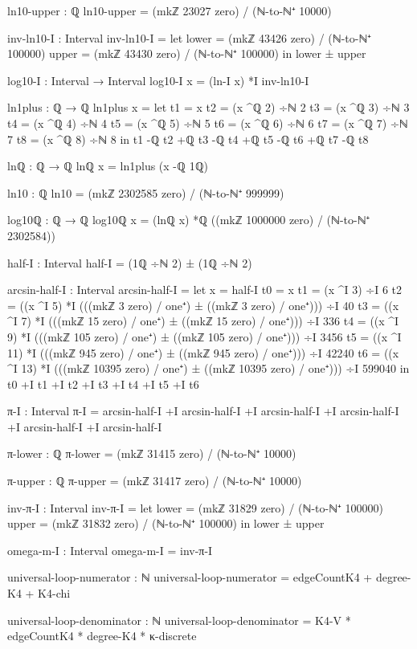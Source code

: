 \documentclass[11pt,a4paper]{book}
\begin{document}
\begin{code}
ln10-upper : ℚ
ln10-upper = (mkℤ 23027 zero) / (ℕ-to-ℕ⁺ 10000)

inv-ln10-I : Interval
inv-ln10-I = 
  let lower = (mkℤ 43426 zero) / (ℕ-to-ℕ⁺ 100000)
      upper = (mkℤ 43430 zero) / (ℕ-to-ℕ⁺ 100000)
  in lower ± upper

log10-I : Interval → Interval
log10-I x = (ln-I x) *I inv-ln10-I

ln1plus : ℚ → ℚ
ln1plus x = 
  let t1 = x
      t2 = (x ^ℚ 2) ÷ℕ 2
      t3 = (x ^ℚ 3) ÷ℕ 3
      t4 = (x ^ℚ 4) ÷ℕ 4
      t5 = (x ^ℚ 5) ÷ℕ 5
      t6 = (x ^ℚ 6) ÷ℕ 6
      t7 = (x ^ℚ 7) ÷ℕ 7
      t8 = (x ^ℚ 8) ÷ℕ 8
  in t1 -ℚ t2 +ℚ t3 -ℚ t4 +ℚ t5 -ℚ t6 +ℚ t7 -ℚ t8

lnℚ : ℚ → ℚ
lnℚ x = ln1plus (x -ℚ 1ℚ)

ln10 : ℚ
ln10 = (mkℤ 2302585 zero) / (ℕ-to-ℕ⁺ 999999)

log10ℚ : ℚ → ℚ
log10ℚ x = (lnℚ x) *ℚ ((mkℤ 1000000 zero) / (ℕ-to-ℕ⁺ 2302584))

half-I : Interval
half-I = (1ℚ ÷ℕ 2) ± (1ℚ ÷ℕ 2)

arcsin-half-I : Interval
arcsin-half-I = 
  let x = half-I
      t0 = x
      t1 = (x ^I 3) ÷I 6
      t2 = ((x ^I 5) *I (((mkℤ 3 zero) / one⁺) ± ((mkℤ 3 zero) / one⁺))) ÷I 40
      t3 = ((x ^I 7) *I (((mkℤ 15 zero) / one⁺) ± ((mkℤ 15 zero) / one⁺))) ÷I 336
      t4 = ((x ^I 9) *I (((mkℤ 105 zero) / one⁺) ± ((mkℤ 105 zero) / one⁺))) ÷I 3456
      t5 = ((x ^I 11) *I (((mkℤ 945 zero) / one⁺) ± ((mkℤ 945 zero) / one⁺))) ÷I 42240
      t6 = ((x ^I 13) *I (((mkℤ 10395 zero) / one⁺) ± ((mkℤ 10395 zero) / one⁺))) ÷I 599040
  in t0 +I t1 +I t2 +I t3 +I t4 +I t5 +I t6

π-I : Interval
π-I = arcsin-half-I +I arcsin-half-I +I arcsin-half-I +I 
      arcsin-half-I +I arcsin-half-I +I arcsin-half-I

π-lower : ℚ
π-lower = (mkℤ 31415 zero) / (ℕ-to-ℕ⁺ 10000)

π-upper : ℚ
π-upper = (mkℤ 31417 zero) / (ℕ-to-ℕ⁺ 10000)

inv-π-I : Interval
inv-π-I = 
  let lower = (mkℤ 31829 zero) / (ℕ-to-ℕ⁺ 100000)
      upper = (mkℤ 31832 zero) / (ℕ-to-ℕ⁺ 100000)
  in lower ± upper

omega-m-I : Interval
omega-m-I = inv-π-I

universal-loop-numerator : ℕ
universal-loop-numerator = edgeCountK4 + degree-K4 + K4-chi

universal-loop-denominator : ℕ
universal-loop-denominator = K4-V * edgeCountK4 * degree-K4 * κ-discrete


\end{code}
\end{document}
